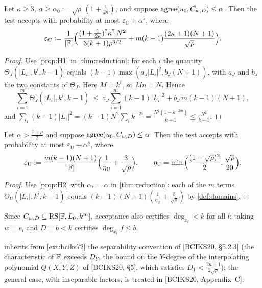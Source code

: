 \begin{consequence}\label{cor:johnson}
Let $\kappa\ge3$, $\alpha\ge\alpha_0:=\sqrt\rho\,(1+\frac1{2\kappa})$, and
suppose $\mathrm{agree}(u_0,C_{w,D})\le\alpha$. Then the test accepts with probability at most
$\varepsilon_C+\alpha^s$, where
\[
\varepsilon_C:=\frac1{|\mathbb{F}|}\Big(\frac{(1+\frac1{2\kappa})^7\kappa^7\,N^2}{3(k+1)\rho^{3/2}}
+m(k-1)\frac{(2\kappa+1)(N+1)}{\sqrt\rho}\Big).
\]
\end{consequence}

\begin{proof}
Use \cref{prop:H1} in \cref{thm:reduction}: for each $i$ the quantity
$\Theta_J(|L_i|,k^i,k-1)$ equals $(k-1)\max(a_J|L_i|^2,b_J(N+1))$, with $a_J$ and $b_J$ the two
constants of $\Theta_J$. Here $M=k^i$, so $Mn=N$. Hence
\[
\sum_{i=1}^{m}\Theta_J(|L_i|,k^i,k-1)\ \le\ a_J\sum_{i=1}^{m}(k-1)|L_i|^2+b_J\,m(k-1)(N+1),
\]
and $\sum_i(k-1)|L_i|^2=(k-1)N^2\sum_ik^{-2i}=\frac{N^2(1-k^{-2m})}{k+1}\le\frac{N^2}{k+1}$.
\end{proof}

\begin{consequence}\label{cor:ud}
Let $\alpha>\frac{1+\rho}2$ and suppose $\mathrm{agree}(u_0,C_{w,D})\le\alpha$. Then the test accepts
with probability at most $\varepsilon_{\mathrm U}+\alpha^s$, where
\[
\varepsilon_{\mathrm U}:=\frac{m(k-1)(N+1)}{|\mathbb{F}|}\Big(\frac1{\eta_{\mathrm U}}+\frac3{\sqrt\rho}\Big),
\qquad \eta_{\mathrm U}=\min\Big(\frac{(1-\sqrt\rho)^2}2,\frac{\sqrt\rho}{20}\Big).
\]
\end{consequence}

\begin{proof}
Use \cref{prop:H2} with $\alpha_*=\alpha$ in \cref{thm:reduction}: each of the $m$ terms
$\Theta_U(|L_i|,k^i,k-1)$ equals $(k-1)(N+1)(\frac1{\eta_{\mathrm U}}+\frac3{\sqrt\rho})$ by \cref{def:domains}.
\end{proof}

\begin{remark}
Since $C_{w,D}\subseteq\mathrm{RS}[\mathbb{F},L_0,k^m]$, acceptance also certifies $\deg_{x_l}<k$ for all $l$;
taking $w=e_l$ and $D=b<k$ certifies $\deg_{x_l}f\le b$.
\end{remark}

\begin{remark}[Characteristic]\label{rem:char}
 inherits from \cref{ext:bciks72} the separability convention of
[BCIKS20, \S5.2.3] (the characteristic of $\mathbb{F}$ exceeds $D_Y$, the bound on the $Y$-degree of the interpolating polynomial $Q(X,Y,Z)$ of [BCIKS20, \S5], which satisfies $D_Y<\frac{2\kappa+1}{2\sqrt\rho}$); the
general case, with inseparable factors, is treated in [BCIKS20, Appendix~C].
\end{remark}
